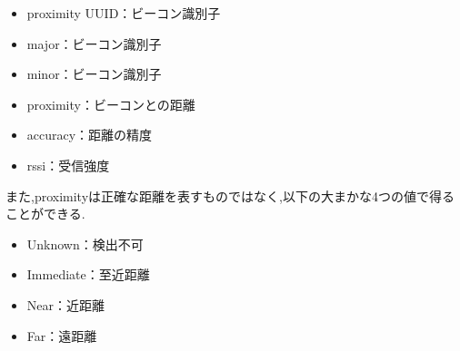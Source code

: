 \begin{itemize}
\item proximity UUID：ビーコン識別子
\item major：ビーコン識別子
\item minor：ビーコン識別子
\item proximity：ビーコンとの距離
\item accuracy：距離の精度
\item rssi：受信強度
\end{itemize}

また,proximityは正確な距離を表すものではなく,以下の大まかな4つの値で得ることができる.

\begin{itemize}
\item Unknown：検出不可
\item Immediate：至近距離
\item Near：近距離
\item Far：遠距離
\end{itemize}
